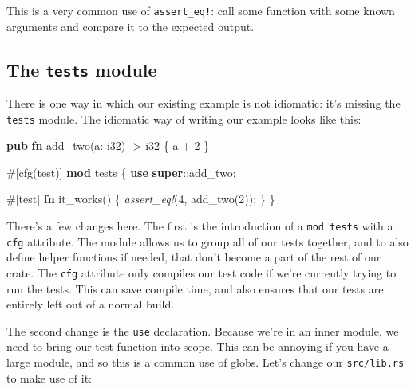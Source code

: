 \documentclass[a4paper,]{book}
\newenvironment{Shaded}{\begin{snugshade}}{\end{snugshade}}
\newcommand{\KeywordTok}[1]{\textcolor[rgb]{0.13,0.29,0.53}{\textbf{{#1}}}}
\newcommand{\DataTypeTok}[1]{\textcolor[rgb]{0.13,0.29,0.53}{{#1}}}
\newcommand{\DecValTok}[1]{\textcolor[rgb]{0.00,0.00,0.81}{{#1}}}
\newcommand{\PreprocessorTok}[1]{\textcolor[rgb]{0.56,0.35,0.01}{\textit{{#1}}}}
\newcommand{\AttributeTok}[1]{\textcolor[rgb]{0.77,0.63,0.00}{{#1}}}
\newcommand{\NormalTok}[1]{{#1}}
\begin{document}
This is a very common use of \texttt{assert\_eq!}: call some function
with some known arguments and compare it to the expected output.

\subsection{\texorpdfstring{The \texttt{tests}
module}{The tests module}}\label{the-tests-module}

There is one way in which our existing example is not idiomatic: it's
missing the \texttt{tests} module. The idiomatic way of writing our
example looks like this:

\begin{Shaded}
\begin{Highlighting}[]
\KeywordTok{pub} \KeywordTok{fn} \NormalTok{add_two(a: }\DataTypeTok{i32}\NormalTok{) -> }\DataTypeTok{i32} \NormalTok{\{}
    \NormalTok{a + }\DecValTok{2}
\NormalTok{\}}

\AttributeTok{#[}\NormalTok{cfg}\AttributeTok{(}\NormalTok{test}\AttributeTok{)]}
\KeywordTok{mod} \NormalTok{tests \{}
    \KeywordTok{use} \KeywordTok{super}\NormalTok{::add_two;}

    \AttributeTok{#[}\NormalTok{test}\AttributeTok{]}
    \KeywordTok{fn} \NormalTok{it_works() \{}
        \PreprocessorTok{assert_eq!}\NormalTok{(}\DecValTok{4}\NormalTok{, add_two(}\DecValTok{2}\NormalTok{));}
    \NormalTok{\}}
\NormalTok{\}}
\end{Highlighting}
\end{Shaded}

There's a few changes here. The first is the introduction of a
\texttt{mod\ tests} with a \texttt{cfg} attribute. The module allows us
to group all of our tests together, and to also define helper functions
if needed, that don't become a part of the rest of our crate. The
\texttt{cfg} attribute only compiles our test code if we're currently
trying to run the tests. This can save compile time, and also ensures
that our tests are entirely left out of a normal build.

The second change is the \texttt{use} declaration. Because we're in an
inner module, we need to bring our test function into scope. This can be
annoying if you have a large module, and so this is a common use of
globs. Let's change our \texttt{src/lib.rs} to make use of it:
\end{document}
